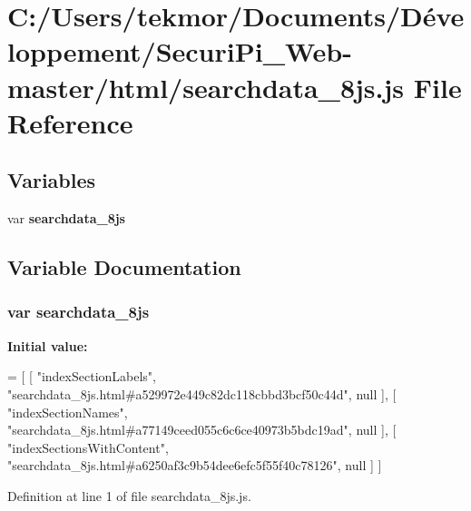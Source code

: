 \section{C\+:/\+Users/tekmor/\+Documents/\+Développement/\+Securi\+Pi\+\_\+\+Web-\/master/html/searchdata\+\_\+8js.js File Reference}
\label{searchdata__8js_8js}
\subsection*{Variables}
\begin{DoxyCompactItemize}
\item 
var {\bf searchdata\+\_\+8js}
\end{DoxyCompactItemize}


\subsection{Variable Documentation}
\subsubsection[{searchdata\+\_\+8js}]{\setlength{\rightskip}{0pt plus 5cm}var searchdata\+\_\+8js}\label{searchdata__8js_8js_a005e6796b7034e7cee7b668a83561477}
{\bfseries Initial value\+:}
\begin{DoxyCode}
=
[
    [ \textcolor{stringliteral}{"indexSectionLabels"}, \textcolor{stringliteral}{"searchdata\_8js.html#a529972e449c82dc118cbbd3bcf50c44d"}, null ],
    [ \textcolor{stringliteral}{"indexSectionNames"}, \textcolor{stringliteral}{"searchdata\_8js.html#a77149ceed055c6c6ce40973b5bdc19ad"}, null ],
    [ \textcolor{stringliteral}{"indexSectionsWithContent"}, \textcolor{stringliteral}{"searchdata\_8js.html#a6250af3c9b54dee6efc5f55f40c78126"}, null ]
]
\end{DoxyCode}


Definition at line 1 of file searchdata\+\_\+8js.\+js.

